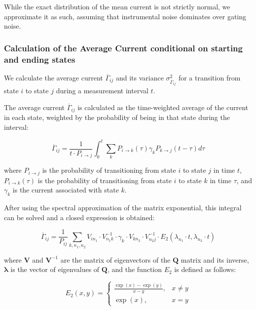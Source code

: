 \documentclass[pdflatex,sn-mathphys-num]{sn-jnl}%
\theoremstyle{thmstyleone}%
\theoremstyle{thmstyletwo}%
\theoremstyle{thmstylethree}%
\begin{document}
While the exact distribution of the mean current is not strictly normal, we approximate it as such, assuming that instrumental noise dominates over gating noise.


\subsubsection{Calculation of the Average Current conditional on starting and ending states} 

We calculate the average current $\overline{\Gamma}_{ij}$ and its variance $\sigma^2_{\overline{\Gamma}_{ij}}$ for a transition from state $i$ to state $j$ during a measurement interval $t$.

The average current $\overline{\Gamma}_{ij}$ is calculated as the time-weighted average of the current in each state, weighted by the probability of being in that state during the interval:

\begin{equation}
	\overline{\Gamma}_{ij} = \frac{1}{t \cdot P_{i \rightarrow j}} \int_0^t \sum_k P_{i \rightarrow k}(\tau) \gamma_k P_{k \rightarrow j}(t-\tau) d\tau
\end{equation}

where $P_{i \rightarrow j}$ is the probability of transitioning from state $i$ to state $j$ in time $t$, $P_{i \rightarrow k}(\tau)$ is the probability of transitioning from state $i$ to state $k$ in time $\tau$, and $\gamma_k$ is the current associated with state $k$.

After using the spectral approximation of the matrix exponential, this integral can be solved and a closed expression is obtained: 

\begin{equation}
	\overline{\Gamma}_{ij} = \frac{1}{P_{ij}}\sum_{k,n_1,n_2} V_{i n_1} \cdot V^{-1}_{n_1 k} \cdot \gamma_k \cdot V_{k n_2} \cdot V^{-1}_{n_2 j} \cdot E_2(\lambda_{n_1} \cdot t, \lambda_{n_2} \cdot t) 
\end{equation}

where $\mathbf{V}$ and $\mathbf{V}^{-1}$ are the matrix of eigenvectors of the $\mathbf{Q}$ matrix and its inverse, $\boldsymbol{\lambda}$ is the vector of eigenvalues of $\mathbf{Q}$, and the function $E_2$ is defined as follows: 

\begin{equation}
	E_2(x,y)= 
	\begin{cases}
		\frac{\exp(x)-\exp(y)}{x-y},& x\neq y\\
		\exp(x),              & x=y
	\end{cases}
\end{equation}
\end{document}
